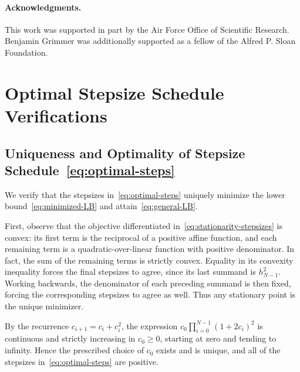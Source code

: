 \documentclass[11pt, hidelinks]{article}
\begin{document}
\paragraph{Acknowledgments.} This work was supported in part by the Air Force Office of Scientific Research. Benjamin Grimmer was additionally supported as a fellow of the Alfred P. Sloan Foundation.
  
{\small
    
    
}



\appendix

\section{Optimal Stepsize Schedule Verifications}

\subsection{Uniqueness and Optimality of Stepsize Schedule~\eqref{eq:optimal-steps}}
\label{app:optimal-stepsizes-verification}

We verify that the stepsizes in~\eqref{eq:optimal-steps} uniquely minimize the lower bound~\eqref{eq:minimized-LB} and attain~\eqref{eq:general-LB}.

First, observe that the objective differentiated in~\eqref{eq:stationarity-stepsizes} is convex: its first term is the reciprocal of a positive affine function, and each remaining term is a quadratic-over-linear function with positive denominator. In fact, the sum of the remaining terms is strictly convex. Equality in its convexity inequality forces the final stepsizes to agree, since its last summand is $h_{N-1}^2$. Working backwards, the denominator of each preceding summand is then fixed, forcing the corresponding stepsizes to agree as well. Thus any stationary point is the unique minimizer.

By the recurrence $c_{i+1}=c_i+c_i^2$, the expression $c_0\prod_{i=0}^{N-1}(1+2c_i)^2$ is continuous and strictly increasing in $c_0\geq0$, starting at zero and tending to infinity. Hence the prescribed choice of $c_0$ exists and is unique, and all of the stepsizes in~\eqref{eq:optimal-steps} are positive.
\end{document}
